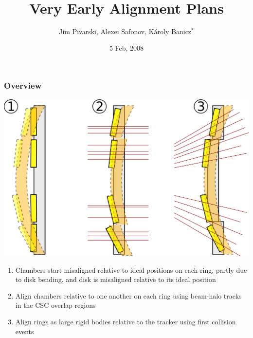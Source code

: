 \documentclass[compress]{beamer}
\title{Very Early Alignment Plans}
\author{Jim Pivarski, Alexei Safonov, K\'aroly Banicz$^*$}
\institute{Texas A\&M University, $^*$FermiLab}
\date{5 Feb, 2008}
\begin{document}
\frame{\titlepage}


\begin{frame}
\frametitle{Overview}
\vspace{-1.2 cm}
\begin{center}
\includegraphics[width=0.7\linewidth]{plan.png}
\end{center}
\begin{enumerate}
\item Chambers start misaligned relative to ideal positions on each
ring, partly due to disk bending, and disk is misaligned relative to
its ideal position
\item Align chambers relative to one another on each ring using
beam-halo tracks in the CSC overlap regions
\item Align rings as large rigid bodies relative to the tracker using
first collision events
\end{enumerate}
\end{frame}
\end{document}
